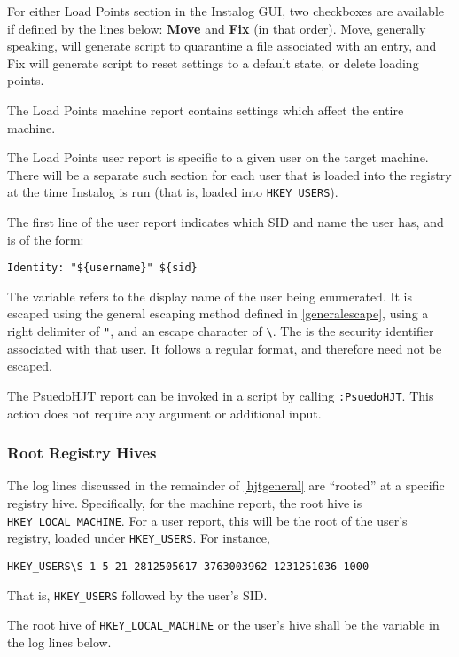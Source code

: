 For either Load Points section in the Instalog GUI, two checkboxes are available
if defined by the lines below: \textbf{Move} and \textbf{Fix} (in that
order).  Move, generally speaking, will generate script to quarantine a file
associated with an entry, and Fix will generate script to reset settings to a
default state, or delete loading points.

The Load Points machine report contains settings which affect the entire machine.

The Load Points user report is specific to a given user on the target machine.
There will be a separate such section for each user that is loaded into the
registry at the time Instalog is run (that is, loaded into \verb|HKEY_USERS|).

The first line of the user report indicates which SID and name the user has, and
is of the form:
\begin{verbatim}
Identity: "${username}" ${sid}
\end{verbatim}

The variable  refers to the display name of the user being
enumerated. It is escaped using the general escaping method defined in
\ref{generalescape}, using a right delimiter of \verb|"|, and an escape
character of \verb|\|. The  is the security identifier associated with
that user. It follows a regular format, and therefore need not be escaped.

The PsuedoHJT report  can be invoked in a script by calling \verb|:PsuedoHJT|. 
This action does not require any argument or additional input.

\subsubsection{Root Registry Hives}
The log lines discussed in the remainder of \ref{hjtgeneral} are ``rooted'' at a
specific registry hive. Specifically, for the machine report, the root hive is
\verb|HKEY_LOCAL_MACHINE|. For a user report, this will be the root of the
user's registry, loaded under \verb|HKEY_USERS|. For instance,
\begin{verbatim}
HKEY_USERS\S-1-5-21-2812505617-3763003962-1231251036-1000
\end{verbatim}
That is, \verb|HKEY_USERS| followed by the user's SID.

The root hive of \verb|HKEY_LOCAL_MACHINE| or the user's hive shall be
the variable  in the log lines below.

